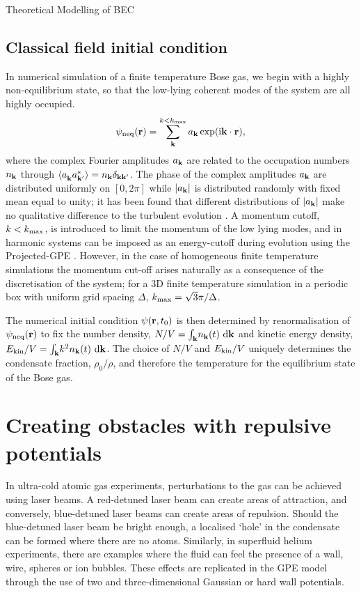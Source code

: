 \begin{chapter}{\label{cha:theoretical_model}Theoretical Modelling of BEC}
\subsection{\label{section:cfieldinitcond} Classical field initial condition}
	In numerical simulation of a finite temperature Bose gas, we begin with a highly non-equilibrium state, so that the low-lying coherent modes of the system are all highly occupied. 
	\begin{equation}
	\psi_{\rm neq}({\bf r}) = \sum \limits_{\bf k}^{k<k_{\rm max}} a_{\bf k} \exp (\mathrm{i}{\bf k}\cdot{\bf r}),
	\label{eq:cFieldIC}
	\end{equation}
	where the complex Fourier amplitudes $a_{\bf k}$ are related to the occupation numbers $n_{\bf k}$ through $\braket{a_{\bf k}^{\,}a_{\bf k'}^*} = n_{\bf k}\delta_{\bf kk'}$. The phase of the complex amplitudes $a_{\bf k}$ are distributed uniformly on $[0,2\pi]$ while $|a_{\bf k}|$ is distributed randomly with fixed mean equal to unity; it has been found that different distributions of $|a_{\bf k}|$ make no qualitative difference to the turbulent evolution \cite{PhysRevA.66.013603}. A momentum cutoff, $k<k_{\rm max}$, is introduced to limit the momentum of the low lying modes, and in harmonic systems can be imposed as an energy-cutoff during evolution using the Projected-GPE \cite{PhysRevLett.87.160402}. However, in the case of homogeneous finite temperature simulations the momentum cut-off arises naturally as a consequence of the discretisation of the system; for a 3D finite temperature simulation in a periodic box with uniform grid spacing $\Delta$, $k_{\rm max}=\sqrt{3} \pi / \Delta$.

	The numerical initial condition $\psi({\bf r},t_0)$ is then determined by renormalisation of $\psi_{\rm neq}({\bf r})$ to fix the number density, $N/V = \int_{\bf k}\!n_{\bf k}(t)~{\rm d}{\bf k}$ and kinetic energy density, $E_{\rm kin}/V = \int_{\bf k}\!k^2n_{\bf k}(t)~{\rm d}{\bf k}$. The choice of $N/V$ and $E_{\rm kin}/V$ uniquely determines the condensate fraction, $\rho_0/\rho$, and therefore the temperature for the equilibrium state of the Bose gas.

\section{\label{section:potentials}Creating obstacles with repulsive potentials}
In ultra-cold atomic gas experiments, perturbations to the gas can be achieved using laser beams. A red-detuned laser beam can create areas of attraction, and conversely, blue-detuned laser beams can create areas of repulsion. Should the blue-detuned laser beam be bright enough, a localised `hole' in the condensate can be formed where there are no atoms. Similarly, in superfluid helium experiments, there are examples where the fluid can feel the presence of a wall, wire, spheres or ion bubbles. These effects are replicated in the GPE model through the use of two and three-dimensional Gaussian or hard wall potentials.

\end{chapter}
